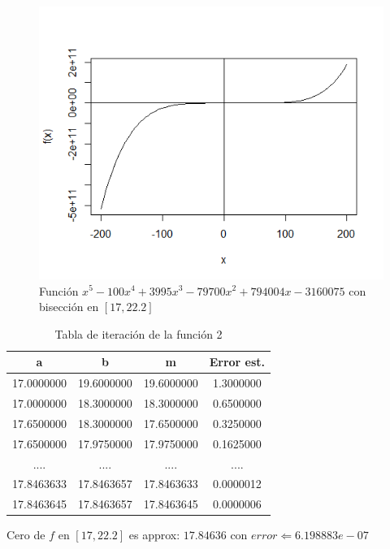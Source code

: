 \documentclass[12pt,a4paper]{article}
\begin{document}
\begin{figure}[h]
\centering
\includegraphics[scale=0.6]{Funcion2}
\caption{Función $x^5 - 100x^4 + 3995x^3 - 79700x^2 + 794004x - 3160075$ con bisección en $[17,22.2]$}
\label{fig:Funcion2}
\end{figure}

\begin{table}[ht]
\centering
\begin{tabular}{|c|c|c|c|}
\hline
a          & b          & m          & Error est. \\ \hline
17.0000000 & 19.6000000 & 19.6000000 & 1.3000000  \\ \hline
17.0000000 & 18.3000000 & 18.3000000 & 0.6500000  \\ \hline
17.6500000 & 18.3000000 & 17.6500000 & 0.3250000  \\ \hline
17.6500000 & 17.9750000 & 17.9750000 & 0.1625000  \\ \hline
....       & ....       & ....       & ....       \\ \hline
17.8463633 & 17.8463657 & 17.8463633 & 0.0000012  \\ \hline
17.8463645 & 17.8463657 & 17.8463645 & 0.0000006  \\ \hline
\end{tabular}
\caption{Tabla de iteración de la función 2}
\label{Funcion2}
\end{table}

Cero de $f$ en $[17 , 22.2]$ es approx:  $17.84636$ con $error \Longleftarrow 6.198883e-07$
\end{document}
